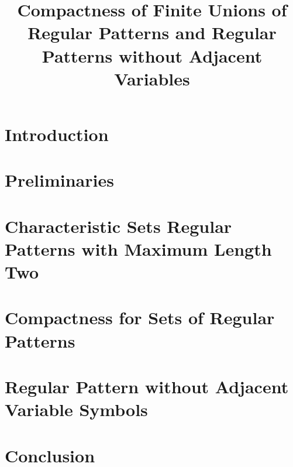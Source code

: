 \documentclass[paper]{ieice}
\title{Compactness of Finite Unions of Regular Patterns and Regular Patterns without Adjacent Variables}
\begin{document}
\maketitle




\section{Introduction}\label{Sec:Intro}


\section{Preliminaries}\label{Sec:Prelim}




\section{Characteristic Sets Regular Patterns with Maximum Length Two}\label{Sec:CharacteristicSet}




\section{Compactness for Sets of Regular Patterns}\label{Sec:Compactness}



\section{Regular Pattern without Adjacent Variable Symbols}\label{Sec:RPAVS}


\section{Conclusion}







\end{document}
